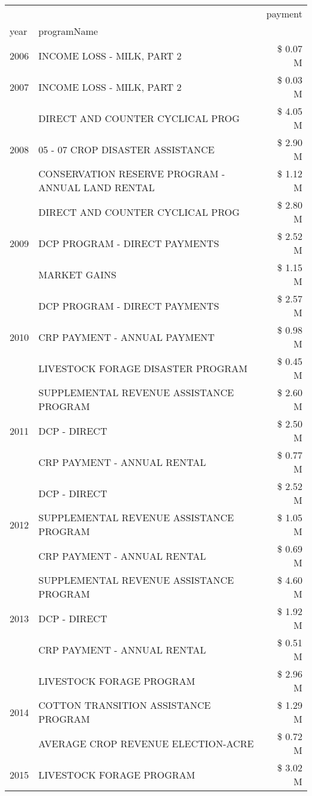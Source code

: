 \begin{tabular}{llr}
\toprule
 &  & payment \\
year & programName &  \\
\midrule
2006 & INCOME LOSS - MILK, PART 2 & \$ 0.07 M \\
\cline{1-3}
2007 & INCOME LOSS - MILK, PART 2 & \$ 0.03 M \\
\cline{1-3}
\multirow[t]{3}{*}{2008} & DIRECT AND COUNTER CYCLICAL PROG & \$ 4.05 M \\
 & 05 - 07 CROP DISASTER ASSISTANCE & \$ 2.90 M \\
 & CONSERVATION RESERVE PROGRAM - ANNUAL LAND RENTAL & \$ 1.12 M \\
\cline{1-3}
\multirow[t]{3}{*}{2009} & DIRECT AND COUNTER CYCLICAL PROG & \$ 2.80 M \\
 & DCP PROGRAM - DIRECT PAYMENTS & \$ 2.52 M \\
 & MARKET GAINS & \$ 1.15 M \\
\cline{1-3}
\multirow[t]{3}{*}{2010} & DCP PROGRAM - DIRECT PAYMENTS & \$ 2.57 M \\
 & CRP PAYMENT - ANNUAL PAYMENT & \$ 0.98 M \\
 & LIVESTOCK FORAGE DISASTER  PROGRAM & \$ 0.45 M \\
\cline{1-3}
\multirow[t]{3}{*}{2011} & SUPPLEMENTAL REVENUE ASSISTANCE PROGRAM & \$ 2.60 M \\
 & DCP - DIRECT & \$ 2.50 M \\
 & CRP PAYMENT - ANNUAL RENTAL & \$ 0.77 M \\
\cline{1-3}
\multirow[t]{3}{*}{2012} & DCP - DIRECT & \$ 2.52 M \\
 & SUPPLEMENTAL REVENUE ASSISTANCE PROGRAM & \$ 1.05 M \\
 & CRP PAYMENT - ANNUAL RENTAL & \$ 0.69 M \\
\cline{1-3}
\multirow[t]{3}{*}{2013} & SUPPLEMENTAL REVENUE ASSISTANCE PROGRAM & \$ 4.60 M \\
 & DCP - DIRECT & \$ 1.92 M \\
 & CRP PAYMENT - ANNUAL RENTAL & \$ 0.51 M \\
\cline{1-3}
\multirow[t]{3}{*}{2014} & LIVESTOCK FORAGE PROGRAM & \$ 2.96 M \\
 & COTTON TRANSITION ASSISTANCE PROGRAM & \$ 1.29 M \\
 & AVERAGE CROP REVENUE ELECTION-ACRE & \$ 0.72 M \\
\cline{1-3}
\multirow[t]{3}{*}{2015} & LIVESTOCK FORAGE PROGRAM & \$ 3.02 M \\

\end{tabular}
